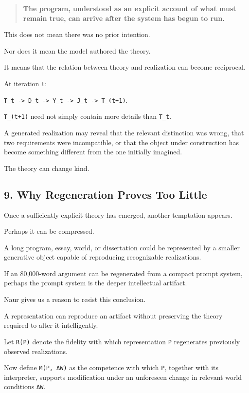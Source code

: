 \documentclass[
]{article}
\begin{document}
\begin{quote}
\textbf{The program, understood as an explicit account of what must
remain true, can arrive after the system has begun to run.}
\end{quote}

This does not mean there was no prior intention.

Nor does it mean the model authored the theory.

It means that the relation between theory and realization can become
reciprocal.

At iteration \texttt{t}:

\texttt{T\_t\ -\textgreater{}\ D\_t\ -\textgreater{}\ Y\_t\ -\textgreater{}\ J\_t\ -\textgreater{}\ T\_(t+1)}.

\texttt{T\_(t+1)} need not simply contain more details than
\texttt{T\_t}.

A generated realization may reveal that the relevant distinction was
wrong, that two requirements were incompatible, or that the object under
construction has become something different from the one initially
imagined.

The theory can change kind.

\subsection{9. Why Regeneration Proves Too
Little}\label{why-regeneration-proves-too-little}

Once a sufficiently explicit theory has emerged, another temptation
appears.

Perhaps it can be compressed.

A long program, essay, world, or dissertation could be represented by a
smaller generative object capable of reproducing recognizable
realizations.

If an 80,000-word argument can be regenerated from a compact prompt
system, perhaps the prompt system is the deeper intellectual artifact.

Naur gives us a reason to resist this conclusion.

A representation can reproduce an artifact without preserving the theory
required to alter it intelligently.

Let \texttt{R(P)} denote the fidelity with which representation
\texttt{P} regenerates previously observed realizations.

Now define \texttt{M(P,\ ΔW)} as the competence with which \texttt{P},
together with its interpreter, supports modification under an unforeseen
change in relevant world conditions \texttt{ΔW}.
\end{document}
